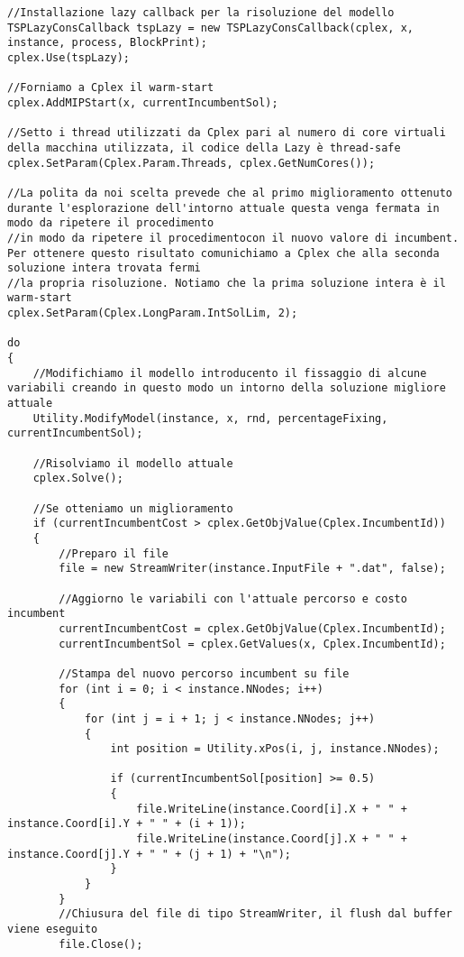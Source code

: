 \documentclass[11pt]{article}
\begin{document}
\begin{lstlisting}
//Installazione lazy callback per la risoluzione del modello
TSPLazyConsCallback tspLazy = new TSPLazyConsCallback(cplex, x, instance, process, BlockPrint);
cplex.Use(tspLazy);

//Forniamo a Cplex il warm-start
cplex.AddMIPStart(x, currentIncumbentSol);

//Setto i thread utilizzati da Cplex pari al numero di core virtuali della macchina utilizzata, il codice della Lazy è thread-safe
cplex.SetParam(Cplex.Param.Threads, cplex.GetNumCores());

//La polita da noi scelta prevede che al primo miglioramento ottenuto durante l'esplorazione dell'intorno attuale questa venga fermata in modo da ripetere il procedimento
//in modo da ripetere il procedimentocon il nuovo valore di incumbent. Per ottenere questo risultato comunichiamo a Cplex che alla seconda soluzione intera trovata fermi
//la propria risoluzione. Notiamo che la prima soluzione intera è il warm-start
cplex.SetParam(Cplex.LongParam.IntSolLim, 2);

do
{
    //Modifichiamo il modello introducento il fissaggio di alcune variabili creando in questo modo un intorno della soluzione migliore attuale
    Utility.ModifyModel(instance, x, rnd, percentageFixing, currentIncumbentSol);

    //Risolviamo il modello attuale
    cplex.Solve();

    //Se otteniamo un miglioramento
    if (currentIncumbentCost > cplex.GetObjValue(Cplex.IncumbentId))
    {
        //Preparo il file
        file = new StreamWriter(instance.InputFile + ".dat", false);

        //Aggiorno le variabili con l'attuale percorso e costo incumbent
        currentIncumbentCost = cplex.GetObjValue(Cplex.IncumbentId);
        currentIncumbentSol = cplex.GetValues(x, Cplex.IncumbentId);

        //Stampa del nuovo percorso incumbent su file
        for (int i = 0; i < instance.NNodes; i++)
        {
            for (int j = i + 1; j < instance.NNodes; j++)
            {
                int position = Utility.xPos(i, j, instance.NNodes);

                if (currentIncumbentSol[position] >= 0.5)
                {
                    file.WriteLine(instance.Coord[i].X + " " + instance.Coord[i].Y + " " + (i + 1));
                    file.WriteLine(instance.Coord[j].X + " " + instance.Coord[j].Y + " " + (j + 1) + "\n");
                }
            }
        }
        //Chiusura del file di tipo StreamWriter, il flush dal buffer viene eseguito
        file.Close();


\end{lstlisting}
\end{document}
